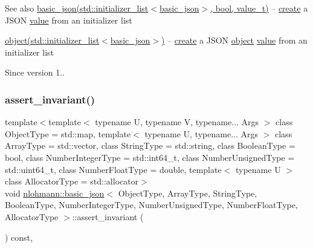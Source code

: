 \begin{DoxySeeAlso}{See also}
\hyperlink{classnlohmann_1_1basic__json_afeb998aec45296bc2050bd1c41ef41eb}{basic\+\_\+json(std\+::initializer\+\_\+list$<$basic\+\_\+json$>$, bool, value\+\_\+t)} -- \hyperlink{classnlohmann_1_1basic__json_afdb7a485369fbfd8c4c7c134ebb1feb5}{create} a J\+S\+ON \hyperlink{classnlohmann_1_1basic__json_a407e73a037e6e3067ef7aa2c25a79f39}{value} from an initializer list 

\hyperlink{classnlohmann_1_1basic__json_ad25b2f8c21e241e2d63455537a9294ff}{object(std\+::initializer\+\_\+list$<$basic\+\_\+json$>$)} -- \hyperlink{classnlohmann_1_1basic__json_afdb7a485369fbfd8c4c7c134ebb1feb5}{create} a J\+S\+ON \hyperlink{classnlohmann_1_1basic__json_ad25b2f8c21e241e2d63455537a9294ff}{object} \hyperlink{classnlohmann_1_1basic__json_a407e73a037e6e3067ef7aa2c25a79f39}{value} from an initializer list
\end{DoxySeeAlso}
\begin{DoxySince}{Since}
version 1.. 
\end{DoxySince}
\hypertarget{classnlohmann_1_1basic__json_a7cb7bffdb2c9b92a68a1feeda36204f6}{}\label{classnlohmann_1_1basic__json_a7cb7bffdb2c9b92a68a1feeda36204f6} 
\subsubsection{\texorpdfstring{assert\+\_\+invariant()}{assert\_invariant()}}
{\footnotesize\ttfamily template$<$template$<$ typename U, typename V, typename... Args $>$ class Object\+Type = std\+::map, template$<$ typename U, typename... Args $>$ class Array\+Type = std\+::vector, class String\+Type  = std\+::string, class Boolean\+Type  = bool, class Number\+Integer\+Type  = std\+::int64\+\_\+t, class Number\+Unsigned\+Type  = std\+::uint64\+\_\+t, class Number\+Float\+Type  = double, template$<$ typename U $>$ class Allocator\+Type = std\+::allocator$>$ \\
void \hyperlink{classnlohmann_1_1basic__json}{nlohmann\+::basic\+\_\+json}$<$ Object\+Type, Array\+Type, String\+Type, Boolean\+Type, Number\+Integer\+Type, Number\+Unsigned\+Type, Number\+Float\+Type, Allocator\+Type $>$\+::assert\+\_\+invariant (\begin{DoxyParamCaption}{ }\end{DoxyParamCaption}) const\hspace{0.3cm}{\ttfamily [inline]}, {\ttfamily [private]}}



